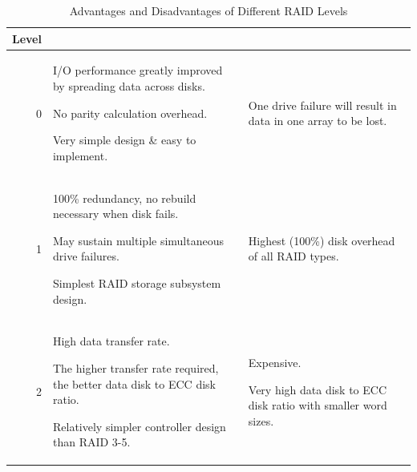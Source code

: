 \begin{table}[H]
    \centering
    \caption{Advantages and Disadvantages of Different RAID Levels}
    \begin{tabularx}{\textwidth}{|r|*{2}{>{\RaggedRight\arraybackslash}X|}}
        \hline
        \multicolumn{1}{|c|}{\textbf{Level}} & \multicolumn{1}{c|}{\textbf{Advantages}} & \multicolumn{1}{c|}{\textbf{Disadvantages}} \\
        \hline

        0 &

        I/O performance greatly improved by spreading data across disks. \par
        No parity calculation overhead. \par
        Very simple design \& easy to implement.
        
        &

        One drive failure will result in data in one array to be lost.
        
        \\ \hline

        1 &

        100\% redundancy, no rebuild necessary when disk fails. \par
        May sustain multiple simultaneous drive failures. \par
        Simplest RAID storage subsystem design.
        
        &

        Highest (100\%) disk overhead of all RAID types.
        
        \\ \hline

        2 &

        High data transfer rate. \par
        The higher transfer rate required, the better data disk to ECC disk ratio. \par
        Relatively simpler controller design than RAID 3-5.
        
        &

        Expensive. \par
        Very high data disk to ECC disk ratio with smaller word sizes.
        
        \\ \hline


\end{tabularx}
\end{table}
